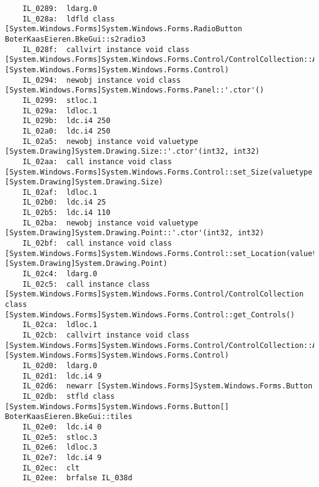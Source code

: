 \begin{lstlisting}
	IL_0289:  ldarg.0 
	IL_028a:  ldfld class [System.Windows.Forms]System.Windows.Forms.RadioButton BoterKaasEieren.BkeGui::s2radio3
	IL_028f:  callvirt instance void class [System.Windows.Forms]System.Windows.Forms.Control/ControlCollection::Add(class [System.Windows.Forms]System.Windows.Forms.Control)
	IL_0294:  newobj instance void class [System.Windows.Forms]System.Windows.Forms.Panel::'.ctor'()
	IL_0299:  stloc.1 
	IL_029a:  ldloc.1 
	IL_029b:  ldc.i4 250
	IL_02a0:  ldc.i4 250
	IL_02a5:  newobj instance void valuetype [System.Drawing]System.Drawing.Size::'.ctor'(int32, int32)
	IL_02aa:  call instance void class [System.Windows.Forms]System.Windows.Forms.Control::set_Size(valuetype [System.Drawing]System.Drawing.Size)
	IL_02af:  ldloc.1 
	IL_02b0:  ldc.i4 25
	IL_02b5:  ldc.i4 110
	IL_02ba:  newobj instance void valuetype [System.Drawing]System.Drawing.Point::'.ctor'(int32, int32)
	IL_02bf:  call instance void class [System.Windows.Forms]System.Windows.Forms.Control::set_Location(valuetype [System.Drawing]System.Drawing.Point)
	IL_02c4:  ldarg.0 
	IL_02c5:  call instance class [System.Windows.Forms]System.Windows.Forms.Control/ControlCollection class [System.Windows.Forms]System.Windows.Forms.Control::get_Controls()
	IL_02ca:  ldloc.1 
	IL_02cb:  callvirt instance void class [System.Windows.Forms]System.Windows.Forms.Control/ControlCollection::Add(class [System.Windows.Forms]System.Windows.Forms.Control)
	IL_02d0:  ldarg.0 
	IL_02d1:  ldc.i4 9
	IL_02d6:  newarr [System.Windows.Forms]System.Windows.Forms.Button
	IL_02db:  stfld class [System.Windows.Forms]System.Windows.Forms.Button[] BoterKaasEieren.BkeGui::tiles
	IL_02e0:  ldc.i4 0
	IL_02e5:  stloc.3 
	IL_02e6:  ldloc.3 
	IL_02e7:  ldc.i4 9
	IL_02ec:  clt 
	IL_02ee:  brfalse IL_038d


\end{lstlisting}
